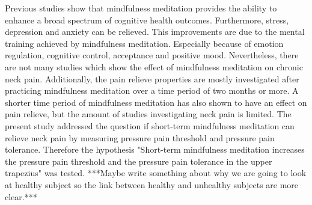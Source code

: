 Previous studies show that mindfulness meditation provides the ability to enhance a broad spectrum of cognitive health outcomes. Furthermore, stress, depression and anxiety can be relieved. This improvements are due to the mental training achieved by mindfulness meditation. Especially because of emotion regulation, cognitive control, acceptance and positive mood. \cite{marcus2009,Zeidan2012} Nevertheless, there are not many studies which show the effect of mindfulness meditation on chronic neck pain. \cite{Macfarlanea2016} Additionally, the pain relieve properties are mostly investigated after practicing mindfulness meditation over a time period of two months or more.  A shorter time period of mindfulness meditation has also shown to have an effect on pain relieve, but the amount of studies investigating neck pain is limited.
The present study addressed the question if short-term mindfulness meditation can relieve neck pain by measuring pressure pain threshold and pressure pain tolerance. Therefore the hypothesis "Short-term mindfulness meditation increases the pressure pain threshold and the pressure pain tolerance in the upper trapezius" was tested. ***Maybe write something about why we are going to look at healthy subject so the link between healthy and unhealthy subjects are more clear.***

